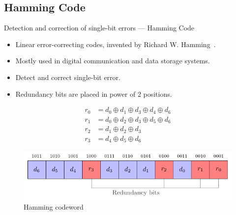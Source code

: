\subsection{Hamming Code}
    \begin{frame}{Detection and correction of single-bit errors — Hamming Code}
        \begin{block}{}
            \begin{itemize}
                \justifying
                \item Linear error-correcting codes, invented by Richard W. Hamming~\cite{H-50-bstj}.
                \item Mostly used in digital communication and data storage systems.
                \item Detect and correct single-bit error.
                \item Redundancy bits are placed in power of 2 positions.
            \end{itemize}
        \end{block}

        \begin{minipage}[c]{0.4\linewidth}
            \begin{equation} \label{equat:hamming_encoder}
                \begin{split}
                    r_{0} &= d_{0} \oplus d_{1} \oplus d_{3} \oplus d_{4} \oplus d_{6} \\
                    r_{1} &= d_{0} \oplus d_{2} \oplus d_{3} \oplus d_{5} \oplus d_{6} \\
                    r_{2} &= d_{1} \oplus d_{2} \oplus d_{3} \\
                    r_{3} &= d_{4} \oplus d_{5} \oplus d_{6}
                \end{split}
            \end{equation}
        \end{minipage}\hfill%
        \begin{minipage}[c]{0.55\linewidth}
            \begin{figure}
                \centering
                \includegraphics[width=\textwidth, page=1]{src/4_strategies/img/hamming_bit.pdf}
                \caption{Hamming codeword}
                \label{fig:hamming_codeword}
            \end{figure}
        \end{minipage}
    \end{frame}
